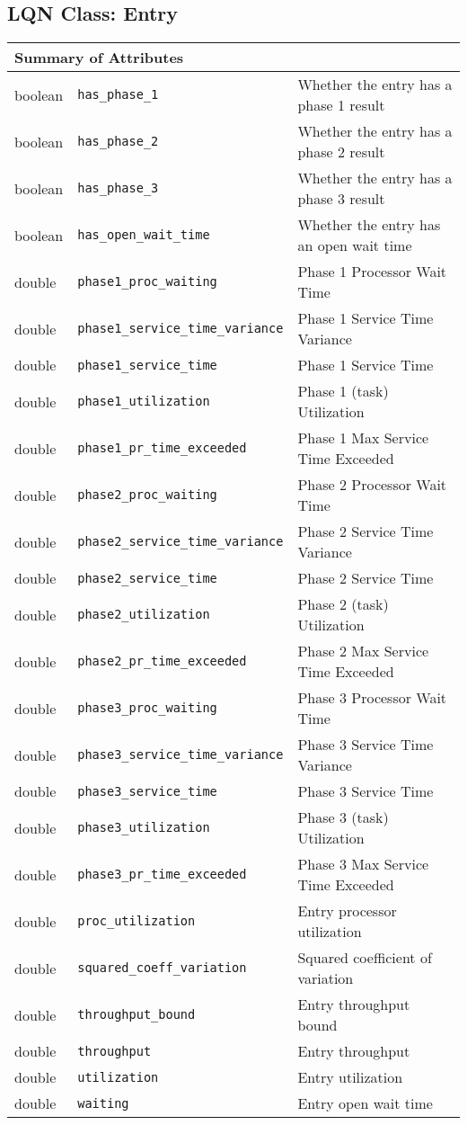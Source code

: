 \subsection{LQN Class: Entry}
\begin{tabular}{|p{1.0in}|p{2.3in}||p{2.8in}|}
  \hline
  \multicolumn{3}{|l|}{\textbf{Summary of Attributes}}\\
  \hline
  boolean & {\tt has\_phase\_1} & Whether the entry has a phase 1 result\\
  boolean & {\tt has\_phase\_2} & Whether the entry has a phase 2 result\\
  boolean & {\tt has\_phase\_3} & Whether the entry has a phase 3 result\\
  boolean & {\tt has\_open\_wait\_time} & Whether the entry has an open wait time\\
  double & {\tt phase1\_proc\_waiting} & Phase 1 Processor Wait Time\\
  double & {\tt phase1\_service\_time\_variance} & Phase 1 Service Time Variance\\
  double & {\tt phase1\_service\_time} & Phase 1 Service Time\\
  double & {\tt phase1\_utilization} & Phase 1 (task) Utilization\\
  double & {\tt phase1\_pr\_time\_exceeded} & Phase 1 Max Service Time Exceeded\\
  double & {\tt phase2\_proc\_waiting} & Phase 2 Processor Wait Time\\
  double & {\tt phase2\_service\_time\_variance} & Phase 2 Service Time Variance\\
  double & {\tt phase2\_service\_time} & Phase 2 Service Time\\
  double & {\tt phase2\_utilization} & Phase 2 (task) Utilization\\
  double & {\tt phase2\_pr\_time\_exceeded} & Phase 2 Max Service Time Exceeded\\
  double & {\tt phase3\_proc\_waiting} & Phase 3 Processor Wait Time\\
  double & {\tt phase3\_service\_time\_variance} & Phase 3 Service Time Variance\\
  double & {\tt phase3\_service\_time} & Phase 3 Service Time\\
  double & {\tt phase3\_utilization} & Phase 3 (task) Utilization\\
  double & {\tt phase3\_pr\_time\_exceeded} & Phase 3 Max Service Time Exceeded\\
  double & {\tt proc\_utilization} & Entry processor utilization\\
  double & {\tt squared\_coeff\_variation} & Squared coefficient of variation\\
  double & {\tt throughput\_bound} & Entry throughput bound\\
  double & {\tt throughput} & Entry throughput\\
  double & {\tt utilization} & Entry utilization\\
  double & {\tt waiting} & Entry open wait time\\
  \hline
\end{tabular}
